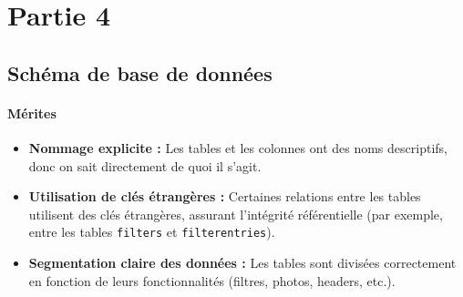 \section{Partie 4}

\subsection{Schéma de base de données}

\paragraph{Mérites}
\begin{itemize}
    \item \textbf{Nommage explicite :} Les tables et les colonnes ont des noms descriptifs, donc on sait directement de quoi il s'agit.
    \item \textbf{Utilisation de clés étrangères :} Certaines relations entre les tables utilisent des clés étrangères, assurant l'intégrité référentielle (par exemple, entre les tables \texttt{filters} et \texttt{filterentries}).
    \item \textbf{Segmentation claire des données :} Les tables sont divisées correctement en fonction de leurs fonctionnalités (filtres, photos, headers, etc.).
\end{itemize}

